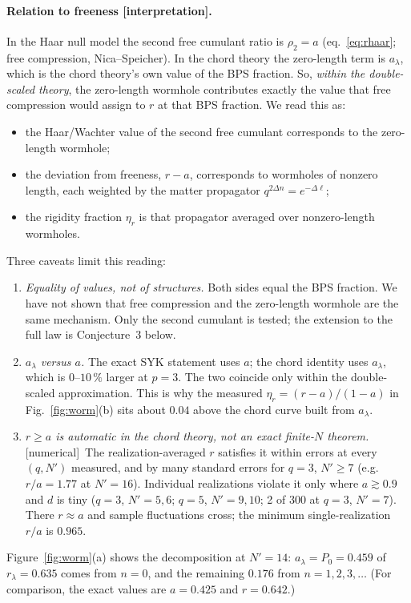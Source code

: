 \documentclass[11pt]{article}
\newcommand{\Np}{N'}
\newcommand{\tagbox}[2]{\textsf{\small\color{#1}[#2]}}
\newcommand{\NUM}{\tagbox{cnum}{numerical}}
\newcommand{\INTERP}{\tagbox{cconj}{interpretation}}
\theoremstyle{remark}
\begin{document}
\paragraph{Relation to freeness \INTERP.} In the Haar null model the second free cumulant ratio is $\rho_2=a$
(eq.~\ref{eq:rhaar}; free compression, Nica--Speicher). In the chord theory the zero-length term is $a_\lambda$, which
is the chord theory's own value of the BPS fraction. So, \emph{within the double-scaled theory}, the zero-length
wormhole contributes exactly the value that free compression would assign to $r$ at that BPS fraction. We read this
as:
\begin{itemize}\itemsep1pt
\item the Haar/Wachter value of the second free cumulant corresponds to the zero-length wormhole;
\item the deviation from freeness, $r-a$, corresponds to wormholes of nonzero length, each weighted by the matter
  propagator $q^{2\Delta n}=e^{-\Delta\ell}$;
\item the rigidity fraction $\eta_r$ is that propagator averaged over nonzero-length wormholes.
\end{itemize}
Three caveats limit this reading:
\begin{enumerate}\itemsep1pt
\item \emph{Equality of values, not of structures.} Both sides equal the BPS fraction. We have not shown that free
  compression and the zero-length wormhole are the same mechanism. Only the second cumulant is tested; the
  extension to the full law is Conjecture~3 below.
\item \emph{$a_\lambda$ versus $a$.} The exact SYK statement uses $a$; the chord identity uses $a_\lambda$, which is
  $0$--$10\,\%$ larger at $p=3$. The two coincide only within the double-scaled approximation. This is why the
  measured $\eta_r=(r-a)/(1-a)$ in Fig.~\ref{fig:worm}(b) sits about $0.04$ above the chord curve built from $a_\lambda$.
\item \emph{$r\ge a$ is automatic in the chord theory, not an exact finite-$N$ theorem.} \NUM\ The realization-averaged
  $r$ satisfies it within errors at every $(q,\Np)$ measured, and by many standard errors for $q=3$, $\Np\ge7$
  (e.g.\ $r/a=1.77$ at $\Np=16$). Individual realizations violate it only where $a\gtrsim0.9$ and $d$ is tiny
  ($q=3$, $\Np=5,6$; $q=5$, $\Np=9,10$; 2 of 300 at $q=3$, $\Np=7$). There $r\approx a$ and sample fluctuations
  cross; the minimum single-realization $r/a$ is $0.965$.
\end{enumerate}
Figure~\ref{fig:worm}(a) shows the decomposition at $\Np=14$: $a_\lambda=P_0=0.459$ of $r_\lambda=0.635$ comes from
$n=0$, and the remaining $0.176$ from $n=1,2,3,\ldots$ (For comparison, the exact values are $a=0.425$ and
$r=0.642$.)
\end{document}

